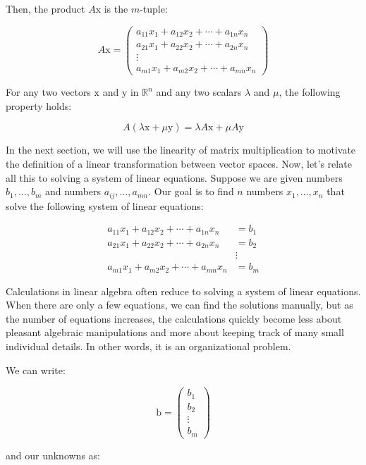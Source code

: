 \documentclass[
]{book}
\theoremstyle{definition}
\theoremstyle{definition}
\theoremstyle{definition}
\theoremstyle{definition}
\theoremstyle{remark}
\begin{document}
Then, the product \(A \mathrm{x}\) is the \(m\)-tuple:

\[
A \mathrm{x} = \begin{pmatrix}
a_{11}x_1 + a_{12}x_2 + \cdots + a_{1n}x_n \\
a_{21}x_1 + a_{22}x_2 + \cdots + a_{2n}x_n \\
\vdots \\
a_{m1}x_1 + a_{m2}x_2 + \cdots + a_{mn}x_n
\end{pmatrix}
\]

For any two vectors \(\mathrm{x}\) and \(\mathrm{y}\) in \(\mathbb{R}^n\) and any two scalars \(\lambda\) and \(\mu\), the following property holds:

\[
A (\lambda \mathrm{x} + \mu \mathrm{y}) = \lambda A \mathrm{x}  + \mu A \mathrm{y}
\]

In the next section, we will use the linearity of matrix multiplication to motivate the definition of a linear transformation between vector spaces. Now, let's relate all this to solving a system of linear equations. Suppose we are given numbers \(b_1, \ldots, b_m\) and numbers \(a_{ij}, \ldots, a_{mn}\). Our goal is to find \(n\) numbers \(x_1, \ldots, x_n\) that solve the following system of linear equations:

\[
\begin{aligned}
a_{11}x_1 + a_{12}x_2 + \cdots + a_{1n}x_n &= b_1 \\
a_{21}x_1 + a_{22}x_2 + \cdots + a_{2n}x_n &= b_2 \\
&\vdots \\
a_{m1}x_1 + a_{m2}x_2 + \cdots + a_{mn}x_n &= b_m
\end{aligned}
\]

Calculations in linear algebra often reduce to solving a system of linear equations. When there are only a few equations, we can find the solutions manually, but as the number of equations increases, the calculations quickly become less about pleasant algebraic manipulations and more about keeping track of many small individual details. In other words, it is an organizational problem.

We can write:

\[
\mathrm{b} = \begin{pmatrix} b_1 \\ b_2 \\ \vdots \\ b_m \end{pmatrix}
\]

and our unknowns as:
\end{document}
